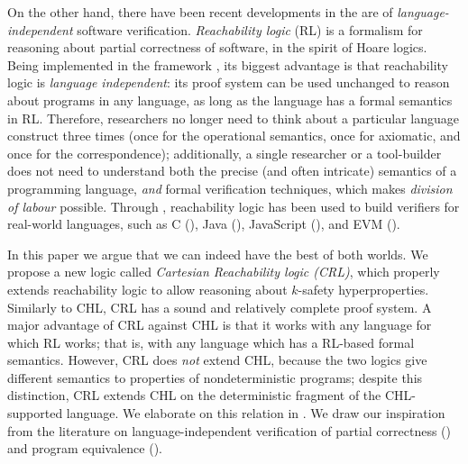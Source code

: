 On the other hand, there have been recent developments in the are of
\emph{language-independent} software verification.  \emph{Reachability logic}
(RL) \cite{RosuS12oopsla,RosuSCM13lics,StefanescuCMMSR19} is a formalism for
reasoning about partial correctness of software, in the spirit of Hoare
logics.  Being implemented in the \K{} framework \cite{KVision}, its biggest
advantage is that reachability logic is \emph{language independent}: its proof
system can be used unchanged to reason about programs in any language, as long
as the language has a formal semantics in RL.  Therefore, researchers no
longer need to think about a particular language construct three times (once
for the operational semantics, once for axiomatic, and once for the
correspondence); additionally, a single researcher or a tool-builder does not
need to understand both the precise (and often intricate) semantics of a
programming language, \emph{and} formal verification techniques, which makes
\emph{division of labour} possible.  Through \K{}, reachability logic has been
used to build verifiers for real-world languages, such as C (\cite{RVMatch}),
Java (\cite{StefanescuPYLR16VerifiersForAll}), JavaScript
(\cite{StefanescuPYLR16VerifiersForAll}), and EVM
(\cite{KevmVerificationTool}).

In this paper we argue that we can indeed have the best of both worlds.  We
propose a new logic called \emph{Cartesian Reachability logic (CRL)}, which
properly extends reachability logic to allow reasoning about $k$-safety
hyperproperties. Similarly to CHL, CRL has a sound and relatively complete
proof system. A major advantage of CRL against CHL is that it works with any
language for which RL works; that is, with any language which has a RL-based
formal semantics.  However, CRL does \emph{not} extend CHL, because the two
logics give different semantics to properties of nondeterministic programs;
despite this distinction, CRL extends CHL on the deterministic fragment of the
CHL-supported language.  We elaborate on this relation in
.  We draw our inspiration from the literature on
language-independent verification of partial correctness
(\cite{RosuS12oopsla,RosuSCM13lics,StefanescuCMMSR19}) and program equivalence
(\cite{CiobacaLRR16,CiobacaLRR14}).  


